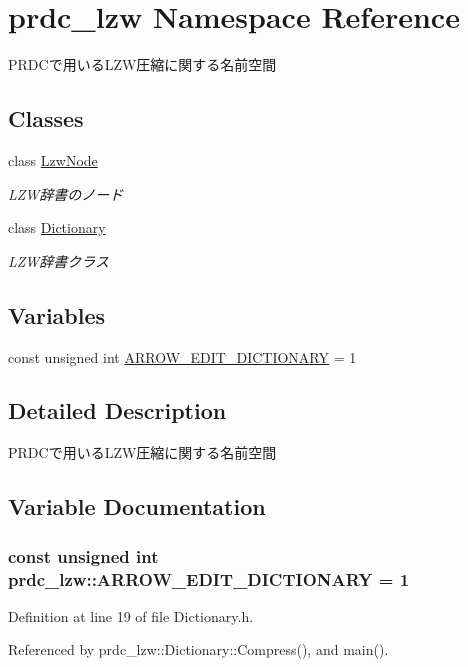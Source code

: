 \hypertarget{namespaceprdc__lzw}{\section{prdc\-\_\-lzw Namespace Reference}
\label{namespaceprdc__lzw}
}


P\-R\-D\-Cで用いる\-L\-Z\-W圧縮に関する名前空間  


\subsection*{Classes}
\begin{DoxyCompactItemize}
\item 
class \hyperlink{classprdc__lzw_1_1LzwNode}{Lzw\-Node}
\begin{DoxyCompactList}\small\item\em L\-Z\-W辞書のノード \end{DoxyCompactList}\item 
class \hyperlink{classprdc__lzw_1_1Dictionary}{Dictionary}
\begin{DoxyCompactList}\small\item\em L\-Z\-W辞書クラス \end{DoxyCompactList}\end{DoxyCompactItemize}
\subsection*{Variables}
\begin{DoxyCompactItemize}
\item 
const unsigned int \hyperlink{namespaceprdc__lzw_ab7c4b021388100d7ca25d23ae566f917}{A\-R\-R\-O\-W\-\_\-\-E\-D\-I\-T\-\_\-\-D\-I\-C\-T\-I\-O\-N\-A\-R\-Y} = 1
\end{DoxyCompactItemize}


\subsection{Detailed Description}
P\-R\-D\-Cで用いる\-L\-Z\-W圧縮に関する名前空間 

\subsection{Variable Documentation}
\hypertarget{namespaceprdc__lzw_ab7c4b021388100d7ca25d23ae566f917}{
\subsubsection[{A\-R\-R\-O\-W\-\_\-\-E\-D\-I\-T\-\_\-\-D\-I\-C\-T\-I\-O\-N\-A\-R\-Y}]{\setlength{\rightskip}{0pt plus 5cm}const unsigned int prdc\-\_\-lzw\-::\-A\-R\-R\-O\-W\-\_\-\-E\-D\-I\-T\-\_\-\-D\-I\-C\-T\-I\-O\-N\-A\-R\-Y = 1}}\label{namespaceprdc__lzw_ab7c4b021388100d7ca25d23ae566f917}


Definition at line 19 of file Dictionary.\-h.



Referenced by prdc\-\_\-lzw\-::\-Dictionary\-::\-Compress(), and main().

